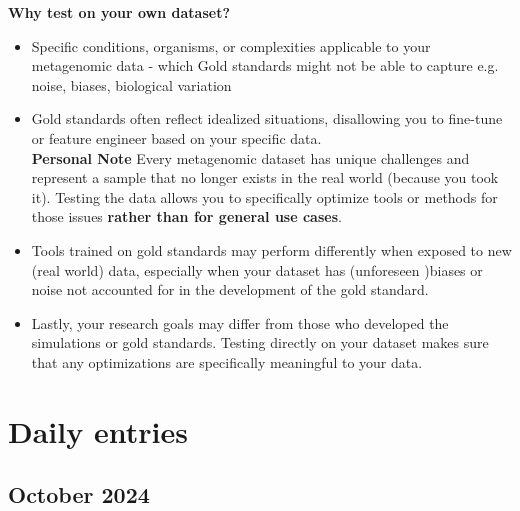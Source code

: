\documentclass[11pt]{report}
\begin{document}
{\begin{tcolorbox}[label=box:Benchmarking, colback=gray!10!white, coltitle=white, colframe=gray!80!black, title=Benchmarking, breakable]
\textbf{Why test on your own dataset?}
\begin{itemize}
	\item Specific conditions, organisms, or complexities applicable to your metagenomic data - which Gold standards might not be able to capture e.g. noise, biases, biological variation
	\item Gold standards often reflect idealized situations, disallowing you to fine-tune or feature engineer based on your specific data.\\
	\textbf{Personal Note} Every metagenomic dataset has unique challenges and represent a sample that no longer exists in the real world (because you took it). Testing the data allows you to specifically optimize tools or methods for those issues \textbf{rather than for general use cases}.
	\item Tools trained on gold standards may perform differently when exposed to new (real world) data, especially when your dataset has (unforeseen )biases or noise not accounted for in the development of the gold standard. 
	\item Lastly, your research goals may differ from those who developed the simulations or gold standards. Testing directly on your dataset makes sure that any optimizations are specifically meaningful to your data.
\end{itemize}	
	
	
	
\end{tcolorbox}

\setcounter{section}{1}
\setcounter{subsection}{0}


\newpage






\nolinenumbers
\part{Daily entries}

\pagestyle{fancy}
\fancyhf{}
\fancyhead[C]{\leftmark}  %
\fancyhead[R]{\thepage}

\renewcommand{\thesection}{\arabic{section}}
\setcounter{section}{0}
\setcounter{subsection}{0}


\chapter{October 2024}
\begin{multicols}{2}

\end{multicols}}
\end{document}
